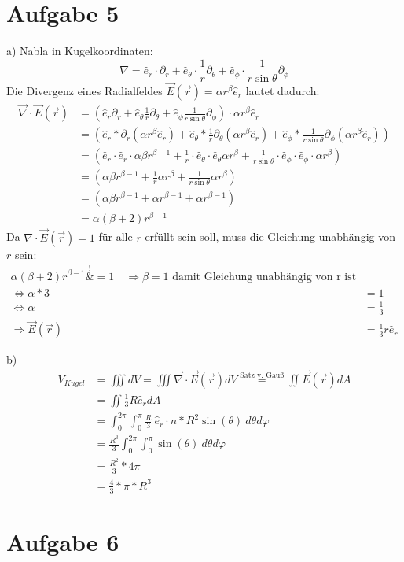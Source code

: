 \documentclass[a4paper]{article}
\newcommand{\delr}{\partial_r}
\newcommand{\delp}{\partial_\phi}
\newcommand{\delt}{\partial_\theta}
\newcommand{\er}{\hat{e}_r}
\newcommand{\et}{\hat{e}_\theta}
\newcommand{\ep}{\hat{e}_\phi}
\begin{document}
\newpage

\section*{Aufgabe 5}
\par{a)}
Nabla in Kugelkoordinaten:
\[ \nabla = \er \cdot \delr + \et \cdot \frac{1}{r} \delt + \ep \cdot \frac{1}{r \sin\theta} \delp \]
Die Divergenz eines Radialfeldes $\vec{E}(\vec{r}) = \alpha r^\beta \er$ lautet dadurch:
\begin{align*}
	\vec{\nabla} \cdot \vec{E}(\vec{r}) 
	&= \left(  \er \delr + \et \frac{1}{r} \delt + \ep  \frac{1}{r \sin\theta} \delp \right) \cdot \alpha r^\beta \er \\
	&= \left(\er * \delr (\alpha r^\beta \er )
		+ \et * \frac{1}{r} \delt (\alpha r^\beta \er )
		+ \ep * \frac{1}{r\sin\theta} \delp (\alpha r^\beta \er) \right) \\
	&= \left(\er \cdot \er \cdot \alpha \beta r^{\beta - 1}
		+ \frac{1}{r} \cdot \et \cdot \et \alpha r^\beta
		+ \frac{1}{r\sin\theta} \cdot \ep \cdot \ep \cdot \alpha r^\beta \right) \\
	&= \left(\alpha \beta r^{\beta - 1}
		+ \frac{1}{r} \alpha r^\beta
		+ \frac{1}{r\sin\theta}  \alpha r^\beta \right) \\
	&= \left( \alpha\beta r^{\beta - 1} +\alpha r^{\beta - 1} +\alpha r^{\beta - 1} \right) \\
	&= \alpha (\beta + 2) r^{\beta - 1}
\end{align*}
Da $\nabla \cdot \vec{E}(\vec{r}) = 1$ für alle $r$ erfüllt sein soll, muss die Gleichung unabhängig von $r$ sein:
\begin{align*}
	\alpha (\beta + 2) r^{\beta - 1} \overset{!}&{=} 1
	\quad \Rightarrow
	\beta = 1 \text{ damit Gleichung unabhängig von r ist}
	\\
	\Leftrightarrow
	\alpha * 3 &= 1 \\
	\Leftrightarrow
	\alpha &= \frac{1}{3} \\
	\Rightarrow \vec{E}(\vec{r}) &= \frac{1}{3} r \hat{e}_r
\end{align*}

\par{b)}
\begin{align*}
	V_{Kugel} 
	&= \iiint dV = \iiint \vec{\nabla} \cdot \vec{E}(\vec{r})dV \overset{\text{Satz v. Gauß}}{=}
	\iint \vec{E}(\vec{r})dA \\
	&= \iint \frac{1}{3} R \hat{e}_r dA \\
	&= \int_0^{2\pi} \int_0^\pi \frac{R}{3} \ \hat{e}_r \cdot \hat{n} * R^2\sin(\theta) \ d\theta d\varphi \\
	&= \frac{R^3}{3} \int_0^{2\pi} \int_0^\pi \sin(\theta) \ d\theta d\varphi \\
	&= \frac{R^2}{3} * 4\pi \\
	&= \frac{4}{3} * \pi * R^3
\end{align*}

\newpage
\section*{Aufgabe 6}
\end{document}
